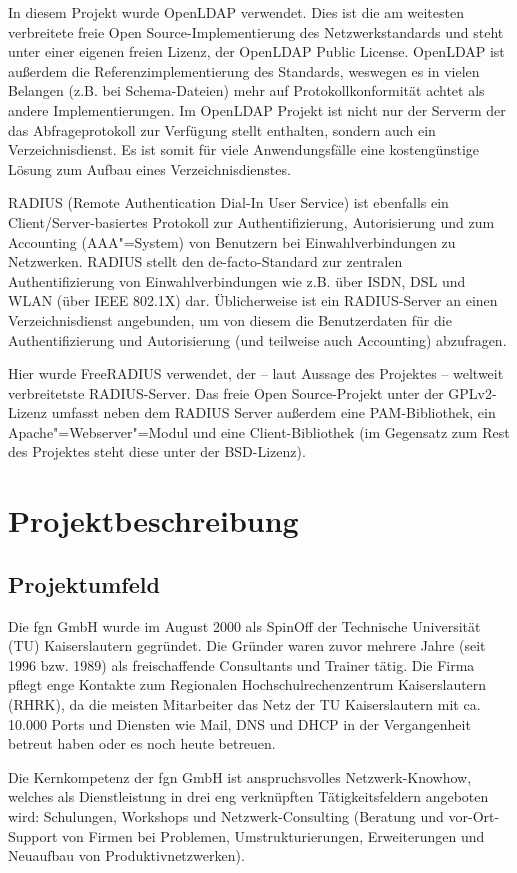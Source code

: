 \documentclass[11pt,a4paper,titlepage=firstiscover,headsepline,bibtotoc]{scrartcl} %
\begin{document}
In diesem Projekt wurde OpenLDAP verwendet. Dies ist die am weitesten verbreitete freie Open Source-Implementierung des Netzwerkstandards und steht unter einer eigenen freien Lizenz, der OpenLDAP Public License. OpenLDAP ist außerdem die Referenzimplementierung des Standards, weswegen es in vielen Belangen (z.B. bei Schema-Dateien) mehr auf Protokollkonformität achtet als andere Implementierungen. Im OpenLDAP Projekt ist nicht nur der Serverm der das Abfrageprotokoll zur Verfügung stellt enthalten, sondern auch ein Verzeichnisdienst. Es ist somit für viele Anwendungsfälle eine kostengünstige Lösung zum Aufbau eines Verzeichnisdienstes.

RADIUS (Remote Authentication Dial-In User Service) ist ebenfalls ein Client/Server-basiertes Protokoll zur Authentifizierung, Autorisierung und zum Accounting (AAA"=System) von Benutzern bei Einwahlverbindungen zu Netzwerken. RADIUS stellt den de-facto-Standard zur zentralen Authentifizierung von Einwahlverbindungen wie z.B. über ISDN, DSL und WLAN (über IEEE 802.1X) dar. Üblicherweise ist ein RADIUS-Server an einen Verzeichnisdienst angebunden, um von diesem die Benutzerdaten für die Authentifizierung und Autorisierung (und teilweise auch Accounting) abzufragen.

Hier wurde FreeRADIUS verwendet, der -- laut Aussage des Projektes -- weltweit verbreitetste RADIUS-Server. Das freie Open Source-Projekt unter der GPLv2-Lizenz umfasst neben dem RADIUS Server außerdem eine PAM-Bibliothek, ein Apache"=Webserver"=Modul und eine Client-Bibliothek (im Gegensatz zum Rest des Projektes steht diese unter der BSD-Lizenz).

\section{Projektbeschreibung}
\subsection{Projektumfeld}
Die fgn GmbH wurde im August 2000 als SpinOff der Technische Universität (TU) Kaiserslautern gegründet. Die Gründer waren zuvor mehrere Jahre (seit 1996 bzw. 1989) als freischaffende Consultants und Trainer tätig. Die Firma pflegt enge Kontakte zum Regionalen Hochschulrechenzentrum Kaiserslautern (RHRK), da die meisten Mitarbeiter das Netz der TU Kaiserslautern mit ca. 10.000 Ports und Diensten wie Mail, DNS und DHCP in der Vergangenheit betreut haben oder es noch heute betreuen.

Die Kernkompetenz der fgn GmbH ist anspruchsvolles Netzwerk-Knowhow, welches als Dienstleistung in drei eng verknüpften Tätigkeitsfeldern angeboten wird: Schulungen, Workshops und Netzwerk-Consulting (Beratung und vor-Ort-Support von Firmen bei Problemen, Umstrukturierungen, Erweiterungen und Neuaufbau von Produktivnetzwerken).
\end{document}
